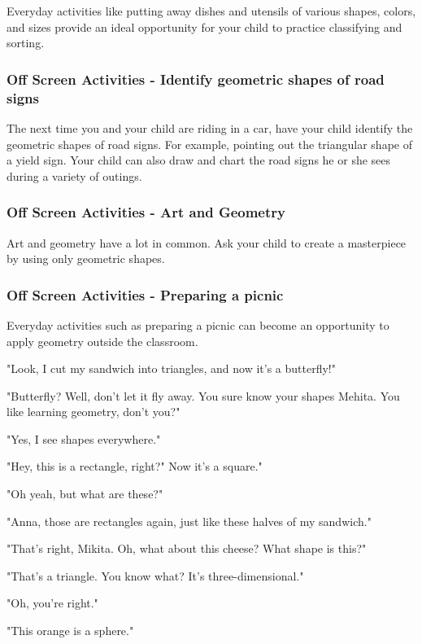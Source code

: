 Everyday activities like putting away dishes and utensils of various shapes, colors, and sizes provide an ideal opportunity for your child to practice classifying and sorting.

\subsubsection{Off Screen Activities - Identify geometric shapes of road signs}

The next time you and your child are riding in a car, have your child identify the geometric shapes of road signs.
For example, pointing out the triangular shape of a yield sign.
Your child can also draw and chart the road signs he or she sees during a variety of outings.

\subsubsection{Off Screen Activities - Art and Geometry}

Art and geometry have a lot in common.
Ask your child to create a masterpiece by using only geometric shapes.

\subsubsection{Off Screen Activities - Preparing a picnic}

Everyday activities such as preparing a picnic can become an opportunity to apply geometry outside the classroom.

"Look, I cut my sandwich into triangles, and now it's a butterfly!"

"Butterfly? Well, don't let it fly away.
You sure know your shapes Mehita.
You like learning geometry, don't you?"

"Yes, I see shapes everywhere."

"Hey, this is a rectangle, right?"
Now it's a square."

"Oh yeah, but what are these?"

"Anna, those are rectangles again, just like these halves of my sandwich."

"That's right, Mikita.
Oh, what about this cheese?
What shape is this?"

"That's a triangle.
You know what?
It's three-dimensional."

"Oh, you're right."

"This orange is a sphere."


